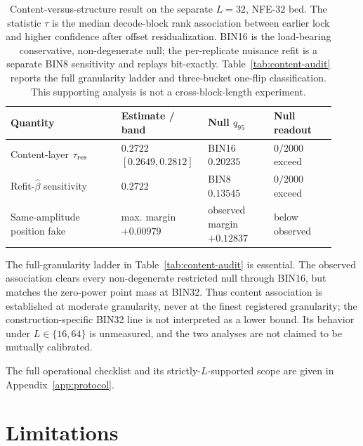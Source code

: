 \documentclass{article}
\begin{document}
\begin{table}[H]
\centering
\small
\setlength{\tabcolsep}{4pt}
\begin{tabular}{@{}>{\raggedright\arraybackslash}p{0.32\linewidth}
                    >{\raggedright\arraybackslash}p{0.23\linewidth}
                    >{\raggedright\arraybackslash}p{0.19\linewidth}
                    >{\raggedright\arraybackslash}p{0.18\linewidth}@{}}
\toprule
Quantity & Estimate / band & Null $q_{95}$ & Null readout \\
\midrule
Content-layer $\tau_{\rm res}$ & $0.2722$ $[0.2649,0.2812]$ & BIN16 $0.20235$ & $0/2000$ exceed \\
Refit-$\hat\beta$ sensitivity & $0.2722$ & BIN8 $0.13545$ & $0/2000$ exceed \\
Same-amplitude position fake & max. margin $+0.00979$ & observed margin $+0.12837$ & below observed \\
\bottomrule
\end{tabular}
\caption{Content-versus-structure result on the separate $L=32$, NFE-$32$
bed. The statistic $\tau$ is the median decode-block rank association between
earlier lock and higher confidence after offset residualization. BIN16 is the
load-bearing conservative, non-degenerate null; the per-replicate nuisance refit
is a separate BIN8 sensitivity and replays bit-exactly. Table~\ref{tab:content-audit}
reports the full granularity ladder and three-bucket one-flip classification.
This supporting analysis is not a cross-block-length experiment.}
\label{tab:content}
\end{table}


The full-granularity ladder in Table~\ref{tab:content-audit} is essential. The
observed association clears every non-degenerate restricted null through BIN16,
but matches the zero-power point mass at BIN32. Thus content association is
established at moderate granularity, never at the finest registered granularity;
the construction-specific BIN32 line is not interpreted as a lower bound. Its
behavior under $L\in\{16,64\}$ is unmeasured, and the two analyses are not
claimed to be mutually calibrated.


The full operational checklist and its strictly-$L$-supported scope are given in
Appendix~\ref{app:protocol}.

\section{Limitations}\label{sec:limits}
\end{document}
